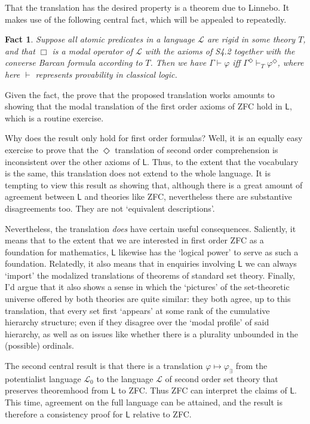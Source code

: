 \documentclass{article}
\newtheorem{fact}{Fact}
\begin{document}
That the translation has the desired property is a theorem due to Linnebo. It makes 
use of the following central fact, which will be appealed to repeatedly. 

\begin{fact}
    Suppose all atomic predicates in a language $\mathcal{L}$ are rigid in some theory $T$,
    and that $\Box$ 
    is a modal operator of $\mathcal{L}$ with the axioms of S4.2 together with the 
    converse Barcan formula according to $T$. Then we have 
    $\Gamma \vdash \varphi$ iff $\Gamma^\Diamond \vdash_T \varphi^\Diamond$, where here 
    $\vdash$ represents provability in classical logic. 
\end{fact}
Given the fact, the prove that the proposed translation works amounts to showing that 
the modal translation of the first order axioms of ZFC hold in $\mathsf{L}$, which is a 
routine exercise. 

Why does the result only hold for first order formulas? Well, it is an equally easy 
exercise to prove that the $\Diamond$ translation of second order comprehension 
is inconsistent over the other axioms of $\mathsf{L}$. Thus, to the extent that 
the vocabulary is the same, this translation does not extend to the whole language. 
It is tempting to view this result as showing that, although there is a great amount 
of agreement between $\mathsf{L}$ and theories like ZFC, nevertheless there are substantive 
disagreements too. They are not `equivalent descriptions'.

Nevertheless, the translation \emph{does} have certain useful consequences. Saliently, 
it means that to the extent that we are interested in first order ZFC as a foundation 
for mathematics, $\mathsf{L}$ likewise has the `logical power' to serve as such a foundation.
Relatedly, it also means that in enquiries involving $\mathsf{L}$ we can always `import'
the modalized translations of theorems of standard set theory. Finally, I'd argue 
that it also shows a sense in which the `pictures' of the set-theoretic universe
offered by both theories are quite similar: they both agree, up to this translation, 
that every set first `appears' at some rank of the cumulative hierarchy structure; 
even if they disagree over the `modal profile' of said hierarchy, as well as on issues 
like whether there is a plurality unbounded in the (possible) ordinals.

The second central result is that there is a translation $\varphi \mapsto \varphi_\exists$ from the 
potentialist language $\mathcal{L}_0$ to the language $\mathcal{L}$ of second order 
set theory that preserves theoremhood from $\mathsf{L}$ to ZFC. Thus ZFC can 
interpret the claims of $\mathsf{L}$. This time, agreement on the full language can be 
attained, and the result is therefore a consistency proof for $\mathsf{L}$ relative to ZFC.
\end{document}
